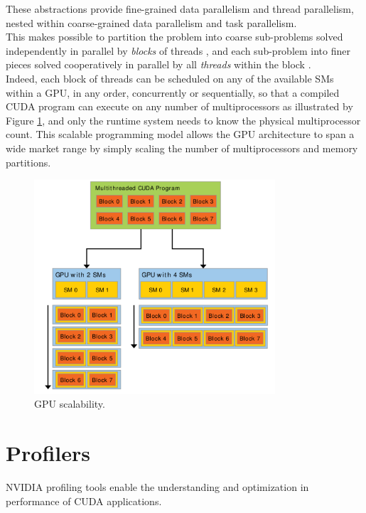 	These abstractions provide fine-grained data parallelism and thread parallelism, nested within coarse-grained data parallelism and task parallelism.\\
	This makes possible to partition the problem into coarse sub-problems \textendash solved
	independently in parallel by \textit{blocks} of threads \textendash, and each sub-problem into finer pieces
	\textendash solved cooperatively in parallel by all \textit{threads} within the block \textendash.	\\

	Indeed, each block of threads can be scheduled on any of the available SMs within a GPU, in any order, concurrently or sequentially, so that a compiled CUDA program can execute on any number of multiprocessors as illustrated by Figure \ref{fig:cudaSM}, and only the runtime system needs to know the physical multiprocessor count.
	This scalable programming model allows the GPU architecture to span a wide market range by simply scaling the number of multiprocessors and memory partitions. \cite{cudaguide} \\ 
	
	\begin{figure}[H]
		\centering
		\includegraphics[width=0.8\textwidth]{images/cudaSMs.png}
		\caption{GPU scalability.}
		\label{fig:cudaSM}
	\end{figure}


\section{Profilers}	
	NVIDIA profiling tools enable the understanding and optimization in performance of CUDA applications. 
	
